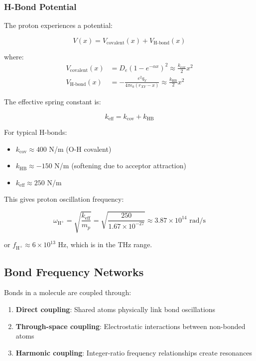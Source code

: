 \subsubsection{H-Bond Potential}

The proton experiences a potential:

\begin{equation}
V(x) = V_{\text{covalent}}(x) + V_{\text{H-bond}}(x)
\end{equation}

where:
\begin{align}
V_{\text{covalent}}(x) &= D_e(1 - e^{-\alpha x})^2 \approx \frac{k_{\text{cov}}}{2}x^2 \\
V_{\text{H-bond}}(x) &= -\frac{e^2 q_Y}{4\pi\epsilon_0(r_{XY} - x)} \approx \frac{k_{\text{HB}}}{2}x^2
\end{align}

The effective spring constant is:

\begin{equation}
k_{\text{eff}} = k_{\text{cov}} + k_{\text{HB}}
\end{equation}

For typical H-bonds:
\begin{itemize}
\item $k_{\text{cov}} \approx 400$ N/m (O-H covalent)
\item $k_{\text{HB}} \approx -150$ N/m (softening due to acceptor attraction)
\item $k_{\text{eff}} \approx 250$ N/m
\end{itemize}

This gives proton oscillation frequency:

\begin{equation}
\omega_{\text{H}^+} = \sqrt{\frac{k_{\text{eff}}}{m_p}} = \sqrt{\frac{250}{1.67 \times 10^{-27}}} \approx 3.87 \times 10^{14} \text{ rad/s}
\end{equation}

or $f_{\text{H}^+} \approx 6 \times 10^{13}$ Hz, which is in the THz range.

\subsection{Bond Frequency Networks}

Bonds in a molecule are coupled through:

\begin{enumerate}
\item \textbf{Direct coupling}: Shared atoms physically link bond oscillations
\item \textbf{Through-space coupling}: Electrostatic interactions between non-bonded atoms
\item \textbf{Harmonic coupling}: Integer-ratio frequency relationships create resonances
\end{enumerate}

